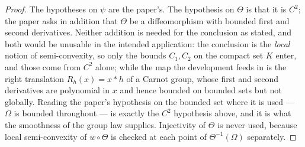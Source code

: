\begin{proof}
The hypotheses on $\psi$ are the paper's. The hypothesis on $\Theta$ is that it is $C^{2}$;
the paper asks in addition that $\Theta$ be a diffeomorphism with bounded first and second
derivatives. Neither addition is needed for the conclusion as stated, and both would be
unusable in the intended application: the conclusion is the \emph{local} notion of
semi-convexity, so only the bounds $C_1,C_2$ on the compact set $K$ enter, and those come
from $C^{2}$ alone; while the map the development feeds in is the right translation
$R_h(x)=x*h$ of a Carnot group, whose first and second derivatives are polynomial in $x$ and
hence bounded on bounded sets but not globally. Reading the paper's hypothesis on the bounded
set where it is used --- $\Omega$ is bounded throughout --- is exactly the $C^{2}$ hypothesis
above, and it is what the smoothness of the group law supplies. Injectivity of $\Theta$ is
never used, because local semi-convexity of $w\circ\Theta$ is checked at each point of
$\Theta^{-1}(\Omega)$ separately.
\end{proof}
